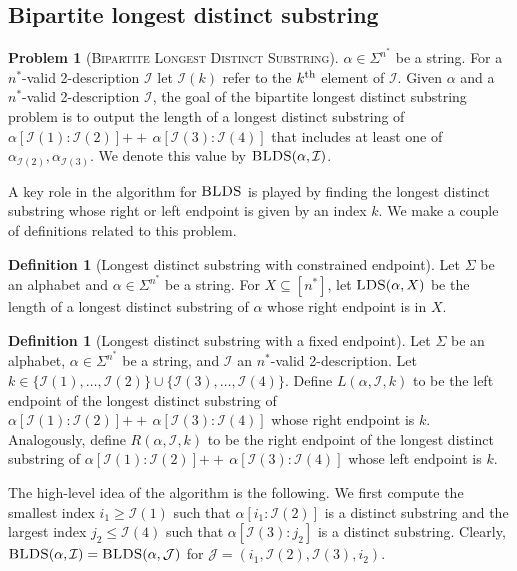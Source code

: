 \documentclass[12pt]{article}
\newcommand{\concat}{\ensuremath{+\!\!\!\!+\,}}
\newcommand{\Iset}{\mathcal{I}}
\newcommand{\Jset}{\mathcal{J}}
\newcommand{\bldsf}{\textsc{Bipartite Longest Distinct Substring}}
\newcommand{\blds}{\textsc{BLDS}}
\newcommand{\kth}{k^{\scriptsize \mbox{{\rm th}}}}
\newcommand{\upto}{\mathbin{:}}
\newcommand{\lds}{\textsc{LDS}}
\theoremstyle{definition}
\newtheorem{problem}[theorem]{Problem}
\newtheorem{definition}[theorem]{Definition}
\begin{document}
\subsection{Bipartite longest distinct substring}
\begin{problem}[\bldsf] 
$\alpha \in \Sigma^{n^*}$ be a string. For a $n^*$-valid 2-description $\Iset$ let $\Iset(k)$ refer to the $\kth$ element of $\Iset$.  
Given $\alpha$ and a $n^*$-valid 2-description $\Iset$, the goal of the bipartite longest distinct substring problem is to output the length of a longest distinct substring of $\alpha[\Iset(1) \colon \Iset(2)] \concat \alpha[\Iset(3) \colon \Iset(4)]$ that includes at least one of $\alpha_{\Iset(2)}, \alpha_{\Iset(3)}$. 
We denote this value by $\blds(\alpha, \Iset)$. 
\end{problem}

A key role in the algorithm for $\blds$ is played by finding the longest distinct substring whose right or left endpoint is given by an index $k$. We make a couple of definitions related to this problem.

\begin{definition}[Longest distinct substring with constrained endpoint]
Let $\Sigma$ be an alphabet and $\alpha \in \Sigma^{n^*}$ be a string.  For $X \subseteq [n^*]$, let $\lds(\alpha,X)$ be the length of a longest distinct substring of $\alpha$ whose right endpoint is in $X$.
\end{definition}

\begin{definition}[Longest distinct substring with a fixed endpoint]
Let $\Sigma$ be an alphabet, $\alpha \in \Sigma^{n^*}$ be a string, and $\Iset$ an $n^*$-valid 2-description.  
Let $k \in \{\Iset(1), \ldots, \Iset(2)\} \cup \{\Iset(3), \ldots, \Iset(4)\}$. 
Define $L(\alpha, \Iset, k)$  to be the left endpoint of the longest distinct substring of $\alpha[\Iset(1) \upto \Iset(2)] \concat \alpha[\Iset(3) \upto \Iset(4)]$ whose right endpoint is $k$.
Analogously, define $R(\alpha,\Iset, k)$ to be the right endpoint of the longest distinct substring of $\alpha[\Iset(1) \upto \Iset(2)] \concat \alpha[\Iset(3) \upto \Iset(4)]$ whose left endpoint is $k$.  
\end{definition}

The high-level idea of the algorithm is the following.  We first compute the smallest index $i_1 \ge \Iset(1)$ such that $\alpha[i_1 \upto \Iset(2)]$ is a distinct substring and the largest index $j_2 \le \Iset(4)$ such that $\alpha[\Iset(3) \upto j_2]$ is a distinct substring.
Clearly, $\blds(\alpha, \Iset) = \blds(\alpha, \Jset)$ for $\Jset = (i_1, \Iset(2), \Iset(3), i_2)$.
\end{document}

